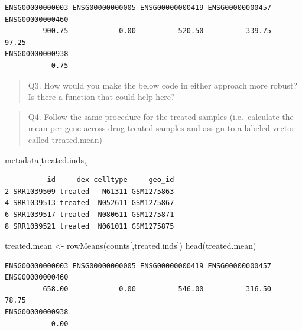 \documentclass[
  letterpaper,
  DIV=11,
  numbers=noendperiod]{scrartcl}
\newenvironment{Shaded}{\begin{snugshade}}{\end{snugshade}}
\newcommand{\FunctionTok}[1]{\textcolor[rgb]{0.28,0.35,0.67}{#1}}
\newcommand{\NormalTok}[1]{\textcolor[rgb]{0.00,0.23,0.31}{#1}}
\newcommand{\OtherTok}[1]{\textcolor[rgb]{0.00,0.23,0.31}{#1}}
\newcommand{\SpecialCharTok}[1]{\textcolor[rgb]{0.37,0.37,0.37}{#1}}
\newcommand{\StringTok}[1]{\textcolor[rgb]{0.13,0.47,0.30}{#1}}
\begin{document}
\begin{verbatim}
ENSG00000000003 ENSG00000000005 ENSG00000000419 ENSG00000000457 ENSG00000000460 
         900.75            0.00          520.50          339.75           97.25 
ENSG00000000938 
           0.75 
\end{verbatim}

\begin{quote}
Q3. How would you make the below code in either approach more robust? Is
there a function that could help here?
\end{quote}

\begin{quote}
Q4. Follow the same procedure for the treated samples (i.e.~calculate
the mean per gene across drug treated samples and assign to a labeled
vector called treated.mean)
\end{quote}

\begin{Shaded}
\end{Shaded}

\begin{Shaded}
\begin{Highlighting}[]
\NormalTok{metadata[treated.inds,]}
\end{Highlighting}
\end{Shaded}

\begin{verbatim}
          id     dex celltype     geo_id
2 SRR1039509 treated   N61311 GSM1275863
4 SRR1039513 treated  N052611 GSM1275867
6 SRR1039517 treated  N080611 GSM1275871
8 SRR1039521 treated  N061011 GSM1275875
\end{verbatim}

\begin{Shaded}
\begin{Highlighting}[]
\NormalTok{treated.mean }\OtherTok{\textless{}{-}} \FunctionTok{rowMeans}\NormalTok{(counts[,treated.inds])}
\FunctionTok{head}\NormalTok{(treated.mean)}
\end{Highlighting}
\end{Shaded}

\begin{verbatim}
ENSG00000000003 ENSG00000000005 ENSG00000000419 ENSG00000000457 ENSG00000000460 
         658.00            0.00          546.00          316.50           78.75 
ENSG00000000938 
           0.00 
\end{verbatim}
\end{document}
